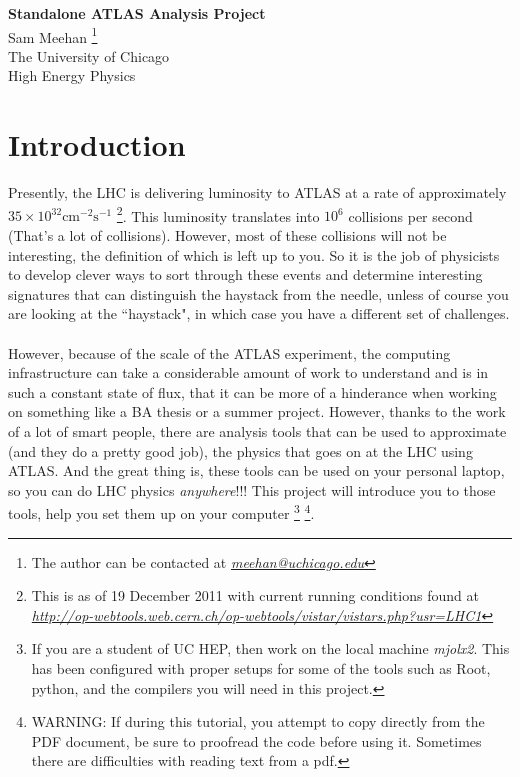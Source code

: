 \documentclass[12pt]{article}
\begin{document}
\begin{center}
{\large \textbf{Standalone ATLAS Analysis Project}} \\
Sam Meehan \footnote{The author can be contacted at \href{mailto:meehan@uchicago.edu}{\textit{meehan@uchicago.edu}} } \\
The University of Chicago \\
High Energy Physics \\


\end{center}

\section{Introduction}
Presently, the LHC is delivering luminosity to ATLAS at a rate of approximately $35 \times 10^{32} \mathrm{cm}^{-2}\mathrm{s}^{-1}$ \footnote{This is as of 19 December 2011 with current running conditions found at \href{http://op-webtools.web.cern.ch/op-webtools/vistar/vistars.php?usr=LHC1}{\textit{http://op-webtools.web.cern.ch/op-webtools/vistar/vistars.php?usr=LHC1}} }.  This luminosity translates into $10^{6}$ collisions per second (That's a lot of collisions).  However, most of these collisions will not be interesting, the definition of which is left up to you.  So it is the job of physicists to develop clever ways to sort through these events and determine interesting signatures that can distinguish the haystack from the needle, unless of course you are looking at the ``haystack", in which case you have a different set of challenges.  \\
\\


However, because of the scale of the ATLAS experiment, the computing infrastructure can take a considerable amount of work to understand and is in such a constant state of flux, that it can be more of a hinderance when working on something like a BA thesis or a summer project.  However, thanks to the work of a lot of smart people, there are analysis tools that can be used to approximate (and they do a pretty good job), the physics that goes on at the LHC using ATLAS.  And the great thing is, these tools can be used on your personal laptop, so you can do LHC physics \textit{anywhere}!!!  This project will introduce you to those tools, help you set them up on your computer \footnote{If you are a student of UC HEP, then work on the local machine \textit{mjolx2}.  This has been configured with proper setups for some of the tools such as Root, python, and the compilers you will need in this project.} \footnote{WARNING: If during this tutorial, you attempt to copy directly from the PDF document, be sure to proofread the code before using it.  Sometimes there are difficulties with reading text from a pdf.}.
\end{document}
